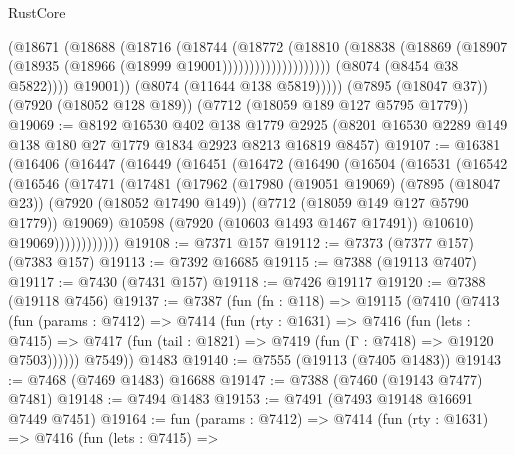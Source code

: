 \begin{lexlean}{RustCore}
\begin{coremodule}
                                  (@18671
                                    (@18688
                                      (@18716
                                        (@18744
                                          (@18772
                                            (@18810
                                              (@18838
                                                (@18869
                                                  (@18907
                                                    (@18935
                                                      (@18966 (@18999 @19001))))))))))))))))))))
                  (@8074 (@8454 @38 @5822))))
              @19001))
          (@8074 (@11644 @138 @5819)))))
    (@7895 (@18047 @37))
    (@7920 (@18052 @128 @189))
    (@7712 (@18059 @189 @127 @5795 @1779))
@19069 := @8192
    @16530
    @402
    @138
    @1779
    @2925
    (@8201 @16530 @2289 @149 @138 @180 @27 @1779 @1834 @2923 @8213 @16819 @8457)
@19107 := @16381
    (@16406
      (@16447
        (@16449
          (@16451
            (@16472
              (@16490
                (@16504
                  (@16531
                    (@16542
                      (@16546
                        (@17471
                          (@17481
                            (@17962
                              (@17980
                                (@19051 @19069)
                                (@7895 (@18047 @23))
                                (@7920 (@18052 @17490 @149))
                                (@7712 (@18059 @149 @127 @5790 @1779))
                                @19069)
                              @10598
                              (@7920 (@10603 @1493 @1467 @17491))
                              @10610)
                            @19069))))))))))))
@19108 := @7371 @157
@19112 := @7373 (@7377 @157) (@7383 @157)
@19113 := @7392 @16685
@19115 := @7388 (@19113 @7407)
@19117 := @7430 (@7431 @157)
@19118 := @7426 @19117
@19120 := @7388 (@19118 @7456)
@19137 := @7387
    (fun (fn : @118) =>
    @19115
      (@7410
        (@7413
          (fun (params : @7412) =>
          @7414
            (fun (rty : @1631) =>
            @7416
              (fun (lets : @7415) =>
              @7417 (fun (tail : @1821) => @7419 (fun (Γ : @7418) => @19120 @7503))))))
        @7549))
    @1483
@19140 := @7555 (@19113 (@7405 @1483))
@19143 := @7468 (@7469 @1483) @16688
@19147 := @7388 (@7460 (@19143 @7477) @7481)
@19148 := @7494 @1483
@19153 := @7491 (@7493 @19148 @16691 @7449 @7451)
@19164 := fun (params : @7412) =>
  @7414
    (fun (rty : @1631) =>
    @7416
      (fun (lets : @7415) =>

\end{coremodule}
\end{lexlean}
